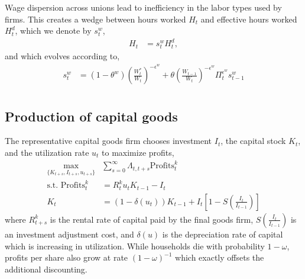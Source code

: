 \documentclass[11pt]{article}
\begin{document}
Wage dispersion across unions lead to inefficiency in the labor types used by firms. This creates a wedge between hours worked $H_t$ and effective hours worked $H_t^d$, which we denote by $s_t^w$,
\begin{align*}
	H_t &= s_t^w H_t^d,
\end{align*}
and which evolves according to,
\begin{align*}
s_t^w	&=(1-\theta^w)\left(\frac{W_t^*}{W_t}\right)^{-\epsilon^w} + \theta \left(\frac{W_{t-1}}{W_t}\right)^{-\epsilon^w}\Pi_t^{\epsilon^w} s_{t-1}^w \\
\end{align*}

\subsection{Production of capital goods}

The representative capital goods firm chooses investment $I_t$, the capital stock $K_t$, and the utilization rate $u_t$ to maximize profits,
\begin{align*}
	\max_{\{K_{t+s},I_{t+s}, u_{t+s}\}} &\sum_{s=0}^{\infty}  \Lambda_{t,t+s} \text{Profits}_t^k\\
	\text{s.t. } \text{Profits}_t^k &= R_{t}^k u_{t} K_{t-1} - I_t\\
	K_t &=  (1-\delta(u_t))K_{t-1} + I_t \left[1-S\left(\frac{I_t}{I_{t-1}}\right)\right]
\end{align*}
where $R_{t+s}^k$ is the rental rate of capital paid by the final goods firm,  $S\left(\frac{I_t}{I_{t-1}}\right)$ is an investment adjustment cost, and $\delta(u)$ is the depreciation rate of capital which is increasing in utilization.
While households die with probability $1-\omega$, profits per share also grow at rate $(1-\omega)^{-1}$ which exactly offsets the additional discounting.

\end{document}
